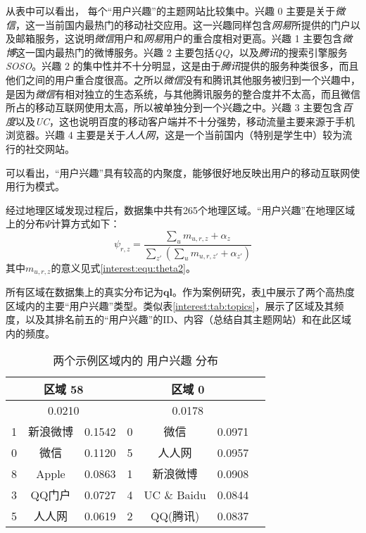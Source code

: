 从表中可以看出， 每个``用户兴趣''的主题网站比较集中。兴趣 0 主要是关于\textit{微信}，这一当前国内最热门的移动社交应用。这一兴趣同样包含\textit{网易}所提供的门户以及邮箱服务，这说明\textit{微信}用户和\textit{网易}用户的重合度相对更高。兴趣 1 主要包含\textit{微博}这一国内最热门的微博服务。兴趣 2 主要包括\textit{QQ}，以及\textit{腾讯}的搜索引擎服务\textit{SOSO}。兴趣 2 的集中性并不十分明显，这是由于\textit{腾讯}提供的服务种类很多，而且他们之间的用户重合度很高。之所以\textit{微信}没有和腾讯其他服务被归到一个兴趣中，是因为\textit{微信}有相对独立的生态系统，与其他腾讯服务的整合度并不太高，而且微信所占的移动互联网使用太高，所以被单独分到一个兴趣之中。兴趣 3 主要包含\textit{百度}以及\textit{UC}，这也说明百度的移动客户端并不十分强势，移动流量主要来源于手机浏览器。兴趣 4 主要是关于\textit{人人网}，这是一个当前国内（特别是学生中）较为流行的社交网站。

可以看出，``用户兴趣''具有较高的内聚度，能够很好地反映出用户的移动互联网使用行为模式。

经过地理区域发现过程后，数据集中共有265个地理区域。``用户兴趣''在地理区域上的分布$\Psi$计算方式如下：
\[
\psi_{r,z} = \frac{\sum_u{m_{u,r,z}} + \alpha_z}{\sum_{z'}{(\sum_u{m_{u,r,z'}} + \alpha_{z'})}}
\]
其中$m_{u,r,z}$的意义见式\ref{interest:equ:theta2}。

所有区域在数据集上的真实分布记为$\mathbf{ql}$。作为案例研究，表\ref{interest:tab:locs}中展示了两个高热度区域内的主要``用户兴趣''类型。类似表\ref{interest:tab:topics}，展示了区域及其频度，以及其排名前五的``用户兴趣''的ID、内容（总结自其主题网站）和在此区域内的频度。

\begin{table}
\centering
\caption{两个示例区域内的 用户兴趣 分布}
\label{interest:tab:locs}
\begin{tabular}{|c|c|c|r|c|c|r|} \hline
 \multicolumn{3}{|c|}{区域 58} & \multicolumn{3}{|c|}{ 区域 0} \\ \hline
 \multicolumn{3}{|c|}{0.0210} & \multicolumn{3}{|c|}{  0.0178} \\ \hline
1 & 新浪微博 & 0.1542 & 0 & 微信 & 0.0971\\ \hline
 0 & 微信 & 0.1120 & 5 & 人人网 & 0.0957\\ \hline
 8 & Apple & 0.0863 & 1 & 新浪微博 & 0.0908\\ \hline
 3 & QQ门户 & 0.0727 & 4 & UC \& Baidu & 0.0844\\ \hline
 5 & 人人网 & 0.0619 & 2 & QQ(腾讯) & 0.0837\\ 
\hline\end{tabular}
\end{table}

